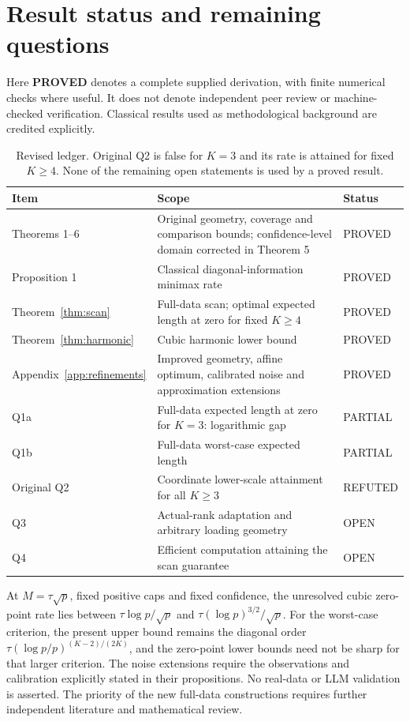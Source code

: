 
\section{Result status and remaining questions}\label{sec:status}
Here \textbf{PROVED} denotes a complete supplied derivation, with finite numerical checks where useful. It does not denote independent peer review or machine-checked verification. Classical results used as methodological background are credited explicitly.

\begin{table}[ht]
\centering\small
\begin{tabularx}{\textwidth}{@{}lYl@{}}
\toprule
Item & Scope & Status\\
\midrule
Theorems 1--6 & Original geometry, coverage and comparison bounds; confidence-level domain corrected in Theorem 5 & PROVED\\
Proposition 1 & Classical diagonal-information minimax rate & PROVED\\
Theorem~\ref{thm:scan} & Full-data scan; optimal expected length at zero for fixed $K\ge4$ & PROVED\\
Theorem~\ref{thm:harmonic} & Cubic harmonic lower bound & PROVED\\
Appendix~\ref{app:refinements} & Improved geometry, affine optimum, calibrated noise and approximation extensions & PROVED\\
Q1a & Full-data expected length at zero for $K=3$: logarithmic gap & PARTIAL\\
Q1b & Full-data worst-case expected length & PARTIAL\\
Original Q2 & Coordinate lower-scale attainment for all $K\ge3$ & REFUTED\\
Q3 & Actual-rank adaptation and arbitrary loading geometry & OPEN\\
Q4 & Efficient computation attaining the scan guarantee & OPEN\\
\bottomrule
\end{tabularx}
\caption{Revised ledger. Original Q2 is false for $K=3$ and its rate is attained for fixed $K\ge4$. None of the remaining open statements is used by a proved result.}
\label{tab:status}
\end{table}

At $M=\tau\sqrt p$, fixed positive caps and fixed confidence, the unresolved cubic zero-point rate lies between $\tau\log p/\sqrt p$ and $\tau(\log p)^{3/2}/\sqrt p$. For the worst-case criterion, the present upper bound remains the diagonal order $\tau(\log p/p)^{(K-2)/(2K)}$, and the zero-point lower bounds need not be sharp for that larger criterion. The noise extensions require the observations and calibration explicitly stated in their propositions. No real-data or LLM validation is asserted. The priority of the new full-data constructions requires further independent literature and mathematical review.
